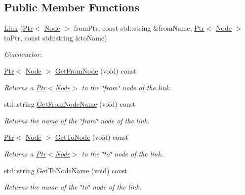 \subsection*{Public Member Functions}
\begin{DoxyCompactItemize}
\item 
\hyperlink{classns3_1_1TopologyReader_1_1Link_a7d6e4872c2fd34d7a9cb84a3b4da8dd4}{Link} (\hyperlink{classns3_1_1Ptr}{Ptr}$<$ \hyperlink{classns3_1_1Node}{Node} $>$ from\+Ptr, const std\+::string \&from\+Name, \hyperlink{classns3_1_1Ptr}{Ptr}$<$ \hyperlink{classns3_1_1Node}{Node} $>$ to\+Ptr, const std\+::string \&to\+Name)
\begin{DoxyCompactList}\small\item\em Constructor. \end{DoxyCompactList}\item 
\hyperlink{classns3_1_1Ptr}{Ptr}$<$ \hyperlink{classns3_1_1Node}{Node} $>$ \hyperlink{classns3_1_1TopologyReader_1_1Link_a6dd427c58cd804ebd3b6526faeceb0fb}{Get\+From\+Node} (void) const 
\begin{DoxyCompactList}\small\item\em Returns a \hyperlink{classns3_1_1Ptr}{Ptr$<$\+Node$>$} to the \char`\"{}from\char`\"{} node of the link. \end{DoxyCompactList}\item 
std\+::string \hyperlink{classns3_1_1TopologyReader_1_1Link_a7e571dd1dbacfdd742262766c6e68ccb}{Get\+From\+Node\+Name} (void) const 
\begin{DoxyCompactList}\small\item\em Returns the name of the \char`\"{}from\char`\"{} node of the link. \end{DoxyCompactList}\item 
\hyperlink{classns3_1_1Ptr}{Ptr}$<$ \hyperlink{classns3_1_1Node}{Node} $>$ \hyperlink{classns3_1_1TopologyReader_1_1Link_a80612d1585878d3a3aee1073f0e67947}{Get\+To\+Node} (void) const 
\begin{DoxyCompactList}\small\item\em Returns a \hyperlink{classns3_1_1Ptr}{Ptr$<$\+Node$>$} to the \char`\"{}to\char`\"{} node of the link. \end{DoxyCompactList}\item 
std\+::string \hyperlink{classns3_1_1TopologyReader_1_1Link_ac38c935401e39d3211847c464c29796b}{Get\+To\+Node\+Name} (void) const 
\begin{DoxyCompactList}\small\item\em Returns the name of the \char`\"{}to\char`\"{} node of the link. \end{DoxyCompactList}\item 

\end{DoxyCompactItemize}
